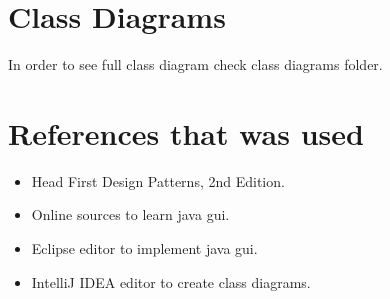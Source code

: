 \documentclass{article}
\begin{document}
\section{Class Diagrams}
In order to see full class diagram check class diagrams folder. 
\section{References that was used} 
\begin{itemize}
	\item Head First Design Patterns, 2nd Edition.
	\item Online sources to learn java gui.
	\item Eclipse editor to implement java gui.
	\item IntelliJ IDEA editor to create class diagrams.
\end{itemize}

   
\end{document}
